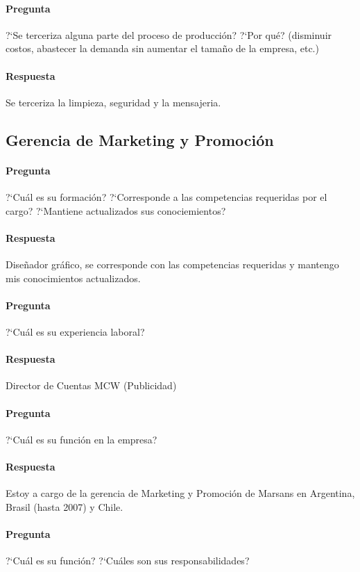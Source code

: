 \documentclass[12pt,a4paper,spanish]{article}
\begin{document}
	\paragraph{Pregunta}
	 ?`Se terceriza alguna parte del proceso de producci\'on?  ?`Por qu\'e? (disminuir costos, abastecer la demanda sin aumentar el tama\~{n}o de la empresa, etc.)
	\paragraph{Respuesta}
	Se terceriza la limpieza, seguridad  y la mensajeria. 

	\subsection{Gerencia de Marketing y Promoci\'on}

	\paragraph{Pregunta}
	 ?`Cu\'al es su formaci\'on?  ?`Corresponde a las competencias requeridas por el cargo?  ?`Mantiene actualizados sus conociemientos?
	\paragraph{Respuesta}
	Dise\~{n}ador gr\'afico, se corresponde con las competencias requeridas y mantengo mis conocimientos actualizados.

	\paragraph{Pregunta}
	 ?`Cu\'al es su experiencia laboral?
	\paragraph{Respuesta}
	Director de Cuentas MCW (Publicidad)

	\paragraph{Pregunta}
	 ?`Cu\'al es su funci\'on en la empresa?
	\paragraph{Respuesta}
	Estoy a cargo de la gerencia de Marketing y Promoci\'on de Marsans en Argentina, Brasil (hasta 2007) y Chile.
	
	\paragraph{Pregunta}
	 ?`Cu\'al es su funci\'on?  ?`Cu\'ales son sus responsabilidades?
\end{document}
